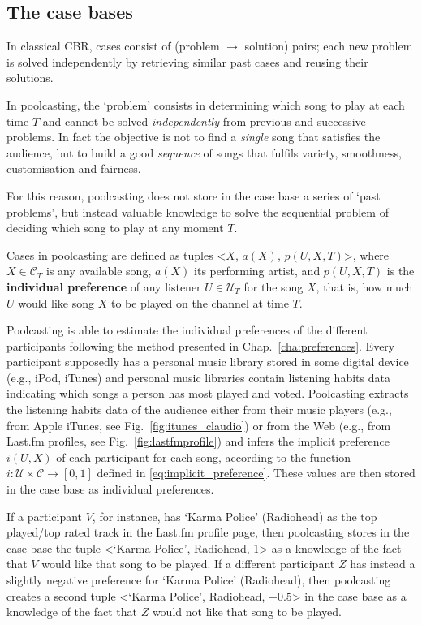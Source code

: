 \subsection{The case bases} %
\label{sub:the_case_base_setup2}

In classical CBR, cases consist of (problem $\rightarrow$ solution) pairs;
each new problem is solved independently by retrieving similar past cases and reusing their solutions.

In poolcasting, the `problem' consists in determining which song to play at each time $T$ and cannot be solved \emph{independently} from previous and successive problems. 
In fact the objective is not to find a \emph{single} song that satisfies the audience, but to build a good \emph{sequence} of songs that fulfils variety, smoothness, customisation and fairness.

For this reason, poolcasting does not store in the case base a series of `past problems', but instead valuable knowledge to solve the sequential problem of deciding which song to play at any moment $T$.

Cases in poolcasting are defined as tuples <$X$, $a(X)$, $p(U,X,T)$>, where $X \in \mathcal{C}_T$ is any available song, $a(X)$ its performing artist, and $p(U,X,T)$ is the \textbf{individual preference} of any listener $U \in \mathcal{U}_T$ for the song $X$, that is, how much $U$ would like song $X$ to be played on the channel at time $T$.

Poolcasting is able to estimate the individual preferences of the different participants following the method presented in Chap.~\ref{cha:preferences}.
Every participant supposedly has a personal music library stored in some digital device (e.g., iPod, iTunes) and personal music libraries contain listening habits data indicating which songs a person has most played and voted.
Poolcasting extracts the listening habits data of the audience either from their music players (e.g., from Apple iTunes, see Fig.~\ref{fig:itunes_claudio}) or from the Web  (e.g., from Last.fm profiles, see Fig.~\ref{fig:lastfmprofile}) and infers the implicit preference $i(U,X)$ of each participant for each song, according to the function $i: \mathcal{U} \times \mathcal{C} \to [0,1]$ defined in \eqref{eq:implicit_preference}.
These values are then stored in the case base as individual preferences.

If a participant $V$, for instance, has `Karma Police' (Radiohead) as the top played/top rated track in the Last.fm profile page, then poolcasting stores in the case base the tuple <`Karma Police', Radiohead, 1> as a knowledge of the fact that $V$ would like that song to be played.
If a different participant $Z$ has instead a slightly negative preference for `Karma Police' (Radiohead), then poolcasting creates a second tuple <`Karma Police', Radiohead, $-0.5$> in the case base as a knowledge of the fact that $Z$ would not like that song to be played.

